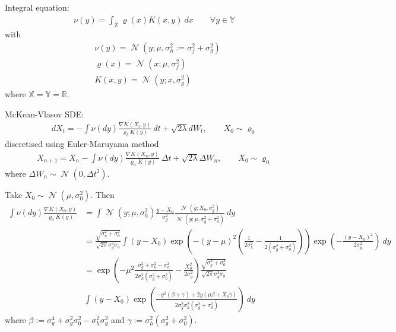 \documentclass[a4paper]{amsart}
\newcommand{\X}{\ensuremath{\mathbb{X}}\xspace}
\newcommand{\Y}{\ensuremath{\mathbb{Y}}\xspace}
\def\real{\mathbb{R}}
\DeclareMathOperator{\N}{\mathcal{N}}
\begin{document}
Integral equation:
\begin{align*}
\nu(y) = \int_{\X} \varrho(x)K(x, y)\ dx \qquad \forall y\in \Y
\end{align*}
with
\begin{align*}
& \nu(y) = \N(y; \mu, \sigma_h^2:= \sigma_f^2 + \sigma_g^2)\\
& \varrho(x) = \N(x; \mu, \sigma_f^2)\\
& K(x, y) = \N(y; x, \sigma_g^2)
\end{align*}
where $\X = \Y = \real$.

McKean-Vlasov SDE:
\begin{align*}
dX_t = -\int \nu(dy)\frac{\nabla K(X_t, y)}{\varrho_tK(y)}\ dt + \sqrt{2\lambda}dW_t,\qquad X_0\sim \varrho_0 
\end{align*}
discretised using Euler-Maruyama method
\begin{align*}
X_{n+1} = X_n -\int \nu(dy)\frac{\nabla K(X_n, y)}{\varrho_n K(y)}\ \Delta t + \sqrt{2\lambda}\Delta W_n,\qquad X_0\sim \varrho_0 
\end{align*}
where $\Delta W_n \sim \N(0, \Delta t^2)$.

Take $X_0\sim \N(\mu, \sigma_0^2)$. Then
\begin{align*}
\int \nu(dy)\frac{\nabla K(X_0, y)}{\varrho_0 K(y)} &= \int \N(y; \mu, \sigma_h^2)\frac{y - X_0}{\sigma_g^2}\frac{\N(y; X_0, \sigma_g^2)}{\N(y; \mu, \sigma_g^2 + \sigma_0^2)}\ dy\\
&= \frac{\sqrt{\sigma_g^2 + \sigma_0^2}}{\sqrt{2\pi}\sigma_g^3\sigma_h}\int (y - X_0)\exp\left( -(y - \mu)^2\left(\frac{1}{2\sigma_h^2} - \frac{1}{2(\sigma_g^2 + \sigma_0^2)} \right)\right)\exp\left( -\frac{(y - X_0)^2}{2\sigma_g^2}\right)\ dy\\
&= \exp\left( -\mu^2\frac{\sigma_g^2 + \sigma_0^2 - \sigma_h^2}{2\sigma_h^2(\sigma_g^2 + \sigma_0^2)} - \frac{X_0^2}{2\sigma_g^2}\right)\frac{\sqrt{\sigma_g^2 + \sigma_0^2}}{\sqrt{2\pi}\sigma_g^3\sigma_h}\\
&\int (y - X_0)\exp\left( \frac{-y^2(\beta + \gamma)+2y(\mu \beta + X_0\gamma)}{2\sigma_g^2\sigma_h^2(\sigma_g^2 + \sigma_0^2)}\right)\ dy
\end{align*}
where $\beta := \sigma_g^4 + \sigma_g^2\sigma_0^2 - \sigma_h^2\sigma_g^2$ and $\gamma := \sigma_h^2(\sigma_g^2 + \sigma_0^2)$.
\end{document}
